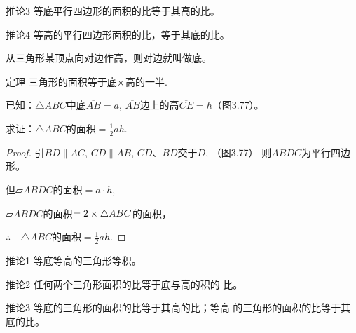 \begin{blk}
    {推论3}
等底平行四边形的面积的比等于其高的比。
\end{blk}

\begin{blk}
    {推论4} 等高的平行四边形面积的比，等于其底的比。
\end{blk}

从三角形某顶点向对边作高，则对边就叫做底。

\begin{blk}
    {定理} 三角形的面积等于底$\times$高的一半.
\end{blk}

已知：$\triangle ABC$中底$\overline{AB}=a$, $\overline{AB}$边上的高$\overline{CE}=h$（图3.77）。

求证：$\triangle ABC$的面积$=\frac{1}{2}ah$.

\begin{figure}[htp]
    \centering
{}
    \caption{}
\end{figure}

\begin{proof}
    引$BD\parallel AC$, $CD\parallel AB$, $CD$、$BD$交于$D$, （图3.77）
则$ABDC$为平行四边形。

但$\parallelogram ABDC$的面积$=a\cdot h$,

$\parallelogram ABDC$的面积$=2\times\triangle ABC$的面积，

$\therefore\quad \triangle ABC$的面积$=\frac{1}{2}ah$.
\end{proof}

\begin{blk}
   {推论1} 等底等高的三角形等积。
\end{blk}

\begin{blk}
    {推论2}
任何两个三角形面积的比等于底与高的积的
比。
\end{blk}


\begin{blk}
    {推论3} 等底的三角形的面积的比等于其高的比；等高
的三角形的面积的比等于其底的比。
\end{blk}

